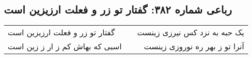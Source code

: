 \begin{center}
\section*{رباعی شماره ۳۸۲: گفتار تو زر و فعلت ارزیزین است}
\label{sec:0382}
\begin{longtable}{l p{0.5cm} r}
گفتار تو زر و فعلت ارزیزین است
&&
یک حبه به نزد کس نیرزی زینست
\\
اسبی که بهاش کم ز ار ز زین است
&&
آنرا تو ز بهر ره نوروزی زینست
\\
\end{longtable}
\end{center}
